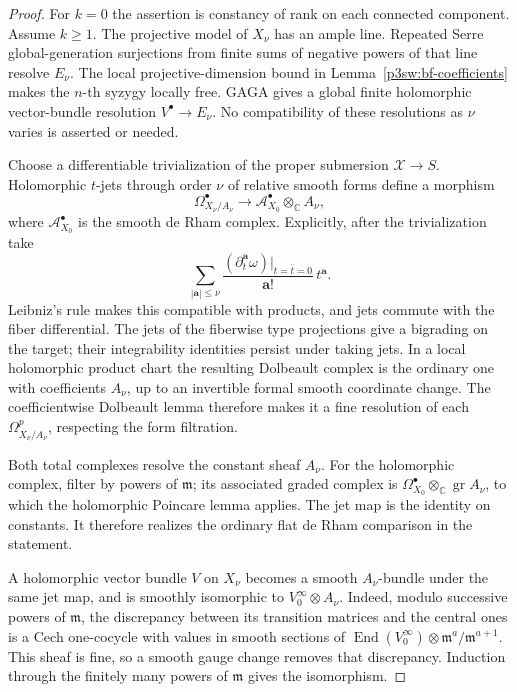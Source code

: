 \documentclass[11pt]{article}
\newcommand{\C}{\mathbb C}
\numberwithin{equation}{section}
\begin{document}
\begin{proof}
For \(k=0\) the assertion is constancy of rank on each connected
component.  Assume \(k\geq1\).
The projective model of \(X_\nu\) has an ample line.  Repeated
Serre global-generation surjections from finite sums of negative
powers of that line resolve \(E_\nu\).  The local
projective-dimension bound in Lemma~\ref{p3sw:bf-coefficients}
makes the \(n\)-th syzygy locally free.  GAGA gives a global finite holomorphic vector-bundle
resolution \(V^\bullet\to E_\nu\).  No compatibility of these
resolutions as \(\nu\) varies is asserted or needed.

Choose a differentiable trivialization of the proper submersion
\(\mathcal X\to S\).  Holomorphic \(t\)-jets through order \(\nu\)
of relative smooth forms define a morphism
\[
 \Omega^\bullet_{X_\nu/A_\nu}
       \longrightarrow \mathcal A^\bullet_{X_0}\otimes_\C A_\nu,
\]
where \(\mathcal A^\bullet_{X_0}\) is the smooth de Rham complex.
Explicitly, after the trivialization take
\[
 \sum_{|\mathbf a|\leq\nu}
 \frac{(\partial_t^{\mathbf a}\omega)|_{t=\bar t=0}}
      {\mathbf a!}\,t^{\mathbf a}.
\]
Leibniz's rule makes this compatible with products, and jets
commute with the fiber differential.  The jets of the fiberwise
type projections give a bigrading on the target; their
integrability identities persist under taking jets.  In a local
holomorphic product chart the resulting Dolbeault complex is the
ordinary one with coefficients \(A_\nu\), up to an invertible
formal smooth coordinate change.  The coefficientwise Dolbeault
lemma therefore makes it a fine resolution of each
\(\Omega^p_{X_\nu/A_\nu}\), respecting the form filtration.

Both total complexes resolve the constant sheaf \(A_\nu\).
For the holomorphic complex, filter by powers of \(\mathfrak m\);
its associated graded complex is
\(\Omega^\bullet_{X_0}\otimes_\C\operatorname{gr}A_\nu\),
to which the holomorphic Poincare lemma applies.  The jet map
is the identity on constants.  It therefore realizes the
ordinary flat de Rham comparison in the statement.

A holomorphic vector bundle \(V\) on \(X_\nu\) becomes a smooth
\(A_\nu\)-bundle under the same jet map, and is smoothly
isomorphic to \(V_0^\infty\otimes A_\nu\).  Indeed, modulo
successive powers of \(\mathfrak m\), the discrepancy between its
transition matrices and the central ones is a Cech one-cocycle
with values in smooth sections of
\(\operatorname{End}(V_0^\infty)\otimes
\mathfrak m^a/\mathfrak m^{a+1}\).  This sheaf is fine, so a
smooth gauge change removes that discrepancy.  Induction through
the finitely many powers of \(\mathfrak m\) gives the isomorphism.


\end{proof}
\end{document}

